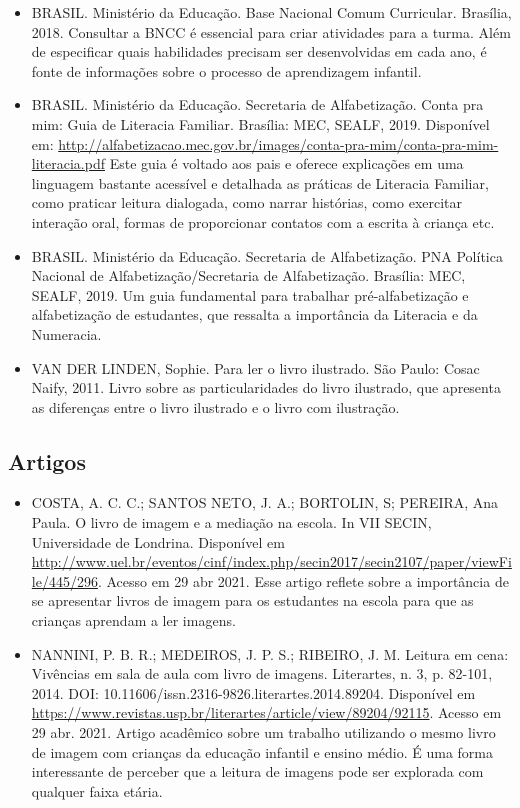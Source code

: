 \documentclass[11pt]{extarticle}
\begin{document}
\begin{itemize}
\item BRASIL. Ministério da Educação. Base Nacional Comum Curricular. Brasília, 2018.
Consultar a BNCC é essencial para criar atividades para a turma. Além de especificar 
quais habilidades precisam ser desenvolvidas em cada ano, é fonte de informações sobre 
o processo de aprendizagem infantil. 

\item BRASIL. Ministério da Educação. Secretaria de Alfabetização. Conta pra mim: Guia de Literacia Familiar. 
Brasília: MEC, SEALF, 2019. Disponível em: \url{http://alfabetizacao.mec.gov.br/images/conta-pra-mim/conta-pra-mim-literacia.pdf}
Este guia é voltado aos pais e oferece explicações em uma linguagem bastante acessível e detalhada as práticas de Literacia Familiar, 
como praticar leitura dialogada, como narrar histórias, como exercitar interação oral, formas de proporcionar contatos com a escrita à criança etc. 
 
\item BRASIL. Ministério da Educação. Secretaria de Alfabetização. PNA Política Nacional de Alfabetização/Secretaria 
de Alfabetização. Brasília: MEC, SEALF, 2019.
Um guia fundamental para trabalhar pré-alfabetização e alfabetização de estudantes, que ressalta a importância da Literacia e da Numeracia. 

\item VAN DER LINDEN, Sophie. Para ler o livro ilustrado. São Paulo: Cosac Naify, 2011.
Livro sobre as particularidades do livro ilustrado, que apresenta as diferenças entre o livro ilustrado e o livro com ilustração. 
\end{itemize}

\subsection{Artigos}

\begin{itemize}
\item COSTA, A. C. C.; SANTOS NETO, J. A.; BORTOLIN, S; PEREIRA, Ana Paula. O livro de imagem e a mediação na escola. 
In VII SECIN, Universidade de Londrina. Disponível em \url{http://www.uel.br/eventos/cinf/index.php/secin2017/secin2107/paper/viewFile/445/296}. 
Acesso em 29 abr 2021. 
Esse artigo reflete sobre a importância de se apresentar livros de imagem para os estudantes na escola para que as crianças aprendam a ler imagens. 

\item NANNINI, P. B. R.; MEDEIROS, J. P. S.; RIBEIRO, J. M. Leitura em cena: Vivências em sala de aula com livro de imagens. 
Literartes, n. 3, p. 82-101, 2014. DOI: 10.11606/issn.2316-9826.literartes.2014.89204. 
Disponível em \url{https://www.revistas.usp.br/literartes/article/view/89204/92115}. Acesso em 29 abr. 2021. 
Artigo acadêmico sobre um trabalho utilizando o mesmo livro de imagem com crianças da educação infantil e ensino médio. 
É uma forma interessante de perceber que a leitura de imagens pode ser explorada com qualquer faixa etária. 
\end{itemize}
\end{document}
